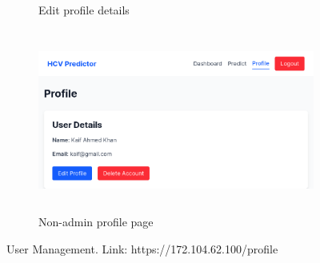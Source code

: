 \begin{figure}[htbp]
\begin{subfigure}{0.5\textwidth}
    \caption{Edit profile details}
    \label{fig:edit}
  \end{subfigure}
  \begin{subfigure}{0.5\textwidth}
    \includegraphics[width=\textwidth, height=6cm]{figures/site/normal.png}
    \caption{Non-admin profile page}
    \label{fig:detail}
  \end{subfigure}
  \caption{User Management. Link: https://172.104.62.100/profile}
  \label{fig:image3}
\end{figure}


